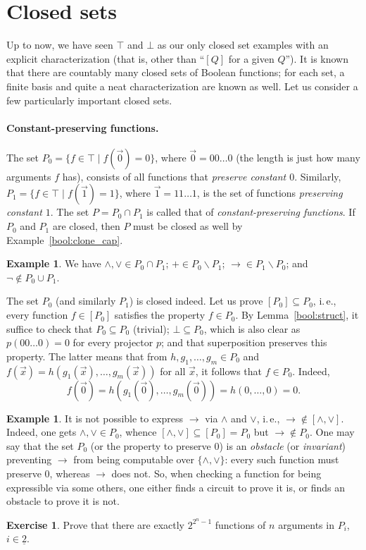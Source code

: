 \documentclass[12pt,notitlepage]{article}
\theoremstyle{plain}
\theoremstyle{definition}
\newtheorem{exc}[thm]{Exercise}
\newtheorem{exm}[thm]{Example}
\theoremstyle{plain}
\newcommand{\sbs}{\subseteq}
\renewcommand{\setminus}{\smallsetminus}
\newcommand{\ul}[1]{\underline{#1}}
\newcommand{\1}{\mathbf{1}}
\newcommand{\0}{\mathbf{0}}
\begin{document}
\section{Closed sets}
Up to now, we have seen $\top$ and $\bot$ as our only closed set examples with an explicit characterization (that is, other than ``$[Q]$ for a given $Q$''). It is known that there are countably many closed sets of Boolean functions; for each set, a finite basis and quite a neat characterization are known as well. Let us consider a few particularly important closed sets.

\paragraph{Constant-preserving functions.}
The set $P_0 = \{ f \in \top \mid f(\vec 0) = 0\}$, where $\vec 0 = 00\ldots0$ (the length is just how many arguments $f$ has), consists of all functions that \emph{preserve constant $0$}. Similarly, $P_1 = \{ f \in \top \mid f(\vec 1) = 1\}$,  where $\vec 1 = 11\ldots1$, is the set of functions \emph{preserving constant $1$}. The set $P = P_0 \cap P_1$ is called that of \emph{constant-preserving functions}. If $P_0$ and $P_1$ are closed, then $P$ must be closed as well by Example~\ref{bool:clone_cap}.

\begin{exm}
We have ${\wedge}, {\vee} \in P_0 \cap P_1$; ${+} \in P_0 \setminus P_1$; ${\to} \in P_1 \setminus P_0$; and $\neg \notin P_0 \cup P_1$.
\end{exm}

The set $P_0$ (and similarly $P_1$) is closed indeed. Let us prove $[P_0] \sbs P_0$, i.\,e., every function $f \in [P_0]$ satisfies the property $f \in P_0$. By Lemma~\ref{bool:struct}, it suffice to check that $P_0 \sbs P_0$ (trivial); $\bot \sbs P_0$, which is also clear as $p(00\ldots0) = 0$ for every projector $p$; and that superposition preserves this property. The latter means that from $h, g_1, \ldots,g_m \in P_0$ and $f(\vec x) = h(g_1(\vec x),\ldots, g_m(\vec x))$ for all $\vec x$, it follows that $f \in P_0$. Indeed,
$$f(\vec 0) = h(g_1(\vec 0),\ldots, g_m(\vec 0)) = h(0, \ldots, 0) = 0.$$

\begin{exm}
It is not possible to express ${\to}$ via ${\wedge}$ and ${\vee}$, i.\,e., ${\to} \notin [{\wedge}, {\vee}]$. Indeed, one gets ${\wedge}, {\vee} \in P_0$, whence $[{\wedge}, {\vee}] \sbs [P_0] = P_0$ but ${\to} \notin P_0$. One may say that the set $P_0$ (or the property to preserve $0$) is an \emph{obstacle} (or \emph{invariant}) preventing ${\to}$ from being computable over $\{{\wedge}, {\vee}\}$: every such function must preserve $0$, whereas ${\to}$ does not. So, when checking a function for being expressible via some others, one either finds a circuit to prove it is, or finds an obstacle to prove it is not. 
\end{exm}
\begin{exc}
Prove that there are exactly $2^{2^n - 1}$ functions of $n$ arguments in $P_i$, $i \in \ul{2}$.
\end{exc}
\end{document}
